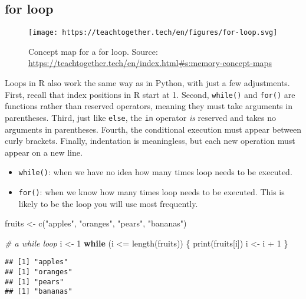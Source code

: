 \documentclass[
]{book}
\newenvironment{Shaded}{\begin{snugshade}}{\end{snugshade}}
\newcommand{\CommentTok}[1]{\textcolor[rgb]{0.56,0.35,0.01}{\textit{#1}}}
\newcommand{\ControlFlowTok}[1]{\textcolor[rgb]{0.13,0.29,0.53}{\textbf{#1}}}
\newcommand{\DecValTok}[1]{\textcolor[rgb]{0.00,0.00,0.81}{#1}}
\newcommand{\FunctionTok}[1]{\textcolor[rgb]{0.00,0.00,0.00}{#1}}
\newcommand{\NormalTok}[1]{#1}
\newcommand{\OtherTok}[1]{\textcolor[rgb]{0.56,0.35,0.01}{#1}}
\newcommand{\SpecialCharTok}[1]{\textcolor[rgb]{0.00,0.00,0.00}{#1}}
\newcommand{\StringTok}[1]{\textcolor[rgb]{0.31,0.60,0.02}{#1}}
\providecommand{\tightlist}{%
  \setlength{\itemsep}{0pt}\setlength{\parskip}{0pt}}
\begin{document}
\hypertarget{for-loop}{%
\subsection{for loop}\label{for-loop}}

\begin{figure}
\centering
\texttt{[image: https://teachtogether.tech/en/figures/for-loop.svg]}
\caption{Concept map for a for loop. Source: \url{https://teachtogether.tech/en/index.html\#s:memory-concept-maps}}
\end{figure}

Loops in R also work the same way as in Python, with just a few adjustments. First, recall that index positions in R start at 1. Second, \texttt{while()} and \texttt{for()} are functions rather than reserved operators, meaning they must take arguments in parentheses. Third, just like \texttt{else}, the \texttt{in} operator \emph{is} reserved and takes no arguments in parentheses. Fourth, the conditional execution must appear between curly brackets. Finally, indentation is meaningless, but each new operation must appear on a new line.

\begin{itemize}
\tightlist
\item
  \texttt{while()}: when we have no idea how many times loop needs to be executed.
\item
  \texttt{for()}: when we know how many times loop needs to be executed. This is likely to be the loop you will use most frequently.
\end{itemize}

\begin{Shaded}
\begin{Highlighting}[]
\NormalTok{fruits }\OtherTok{\textless{}{-}} \FunctionTok{c}\NormalTok{(}\StringTok{"apples"}\NormalTok{, }\StringTok{"oranges"}\NormalTok{, }\StringTok{"pears"}\NormalTok{, }\StringTok{"bananas"}\NormalTok{)}

\CommentTok{\# a while loop}
\NormalTok{i }\OtherTok{\textless{}{-}} \DecValTok{1}
\ControlFlowTok{while}\NormalTok{ (i }\SpecialCharTok{\textless{}=} \FunctionTok{length}\NormalTok{(fruits)) \{}
  \FunctionTok{print}\NormalTok{(fruits[i])}
\NormalTok{  i }\OtherTok{\textless{}{-}}\NormalTok{ i }\SpecialCharTok{+} \DecValTok{1}
\NormalTok{\}}
\end{Highlighting}
\end{Shaded}

\begin{verbatim}
## [1] "apples"
## [1] "oranges"
## [1] "pears"
## [1] "bananas"
\end{verbatim}
\end{document}

